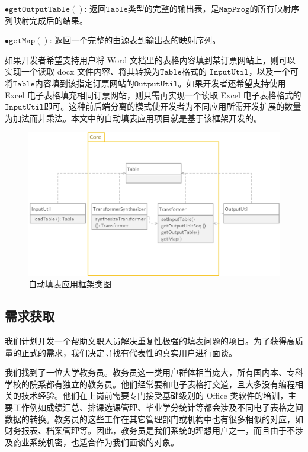 \documentclass[design, pageheader]{njubachelor}
\begin{document}
$\bullet \mathtt{getOutputTable()}$: 返回$\mathtt{Table}$类型的完整的输出表，是$\mathtt{MapProg}$的所有映射序列映射完成后的结果。

$\bullet \mathtt{getMap()}$: 返回一个完整的由源表到输出表的映射序列。

如果开发者希望支持用户将 Word 文档里的表格内容填到某订票网站上，则可以实现一个读取 docx 文件内容、将其转换为$\mathtt{Table}$格式的 $\mathtt{InputUtil}$，以及一个可将$\mathtt{Table}$内容填到该指定订票网站的$\mathtt{OutputUtil}$。如果开发者还希望支持使用 Excel 电子表格填充相同订票网站，则只需再实现一个读取 Excel 电子表格格式的$\mathtt{InputUtil}$即可。这种前后端分离的模式使开发者为不同应用所需开发扩展的数量为加法而非乘法。本文中的自动填表应用项目就是基于该框架开发的。\\
\begin{figure}
    \includegraphics[width=15cm,keepaspectratio]{figures/UML.jpg}
    \caption{自动填表应用框架类图}
    \label{fig:uml}
\end{figure}
\subsection{需求获取}
我们计划开发一个帮助文职人员解决重复性极强的填表问题的项目。为了获得高质量的正式的需求，我们决定寻找有代表性的真实用户进行面谈。

我们找到了一位大学教务员。教务员这一类用户群体相当庞大，所有国内本、专科学校的院系都有独立的教务员。他们经常要和电子表格打交道，且大多没有编程相关的技术经验。他们在上岗前需要专门接受基础级别的 Office 类软件的培训，主要工作例如成绩汇总、排课选课管理、毕业学分统计等都会涉及不同电子表格之间数据的转换。教务员的这些工作在其它管理部门或机构中也有很多相似的对应，如财务报表、档案管理等。因此，教务员是我们系统的理想用户之一，而且由于不涉及商业系统机密，也适合作为我们面谈的对象。
\end{document}
